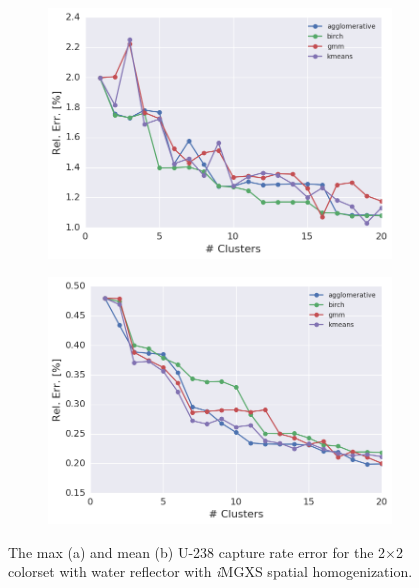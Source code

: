 \begin{figure}[h!]
\centering
\begin{subfigure}{0.9\textwidth}
  \centering
  \includegraphics[width=\linewidth]{figures/results/err-by-cluster/reflector/max-rel-err}
  \caption{}
  \label{fig:chap11-max-capt-err-by-cluster-refl}
\end{subfigure}
\begin{subfigure}{0.9\textwidth}
  \centering
  \includegraphics[width=\linewidth]{figures/results/err-by-cluster/reflector/mean-rel-err}
  \caption{}
  \label{fig:chap11-mean-capt-err-by-cluster-refl}
\end{subfigure}
\caption[U-238 capture error for the 2$\times$2 colorset with reflector]{The max (a) and mean (b) U-238 capture rate error for the 2$\times$2 colorset with water reflector with \textit{i}\ac{MGXS} spatial homogenization.}
\label{fig:chap11-capt-err-by-cluster-refl}
\end{figure}

